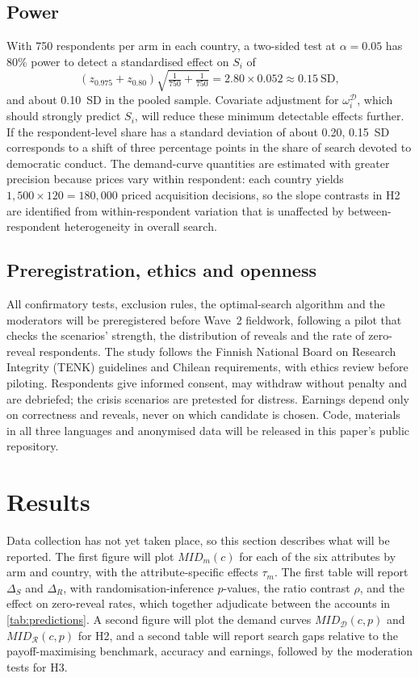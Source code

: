 \documentclass[11pt]{article}
\newcommand{\MID}{\mathit{MID}}
\newcommand{\Dem}{\mathcal{D}}
\newcommand{\Res}{\mathcal{R}}
\begin{document}
\subsection{Power}

With 750 respondents per arm in each country, a two-sided test at $\alpha=0.05$ has 80\% power to detect a standardised effect on $S_i$ of
\[
(z_{0.975}+z_{0.80})\sqrt{\tfrac{1}{750}+\tfrac{1}{750}}=2.80\times0.052\approx0.15\ \text{SD},
\]
and about 0.10~SD in the pooled sample. Covariate adjustment for $\omega_i^{\Dem}$, which should strongly predict $S_i$, will reduce these minimum detectable effects further. If the respondent-level share has a standard deviation of about 0.20, 0.15~SD corresponds to a shift of three percentage points in the share of search devoted to democratic conduct. The demand-curve quantities are estimated with greater precision because prices vary within respondent: each country yields $1{,}500\times120=180{,}000$ priced acquisition decisions, so the slope contrasts in H2 are identified from within-respondent variation that is unaffected by between-respondent heterogeneity in overall search.

\subsection{Preregistration, ethics and openness}

All confirmatory tests, exclusion rules, the optimal-search algorithm and the moderators will be preregistered before Wave~2 fieldwork, following a pilot that checks the scenarios' strength, the distribution of reveals and the rate of zero-reveal respondents. The study follows the Finnish National Board on Research Integrity (TENK) guidelines and Chilean requirements, with ethics review before piloting. Respondents give informed consent, may withdraw without penalty and are debriefed; the crisis scenarios are pretested for distress. Earnings depend only on correctness and reveals, never on which candidate is chosen. Code, materials in all three languages and anonymised data will be released in this paper's public repository.

\section{Results}

Data collection has not yet taken place, so this section describes what will be reported. The first figure will plot $\MID_m(c)$ for each of the six attributes by arm and country, with the attribute-specific effects $\tau_m$. The first table will report $\Delta_S$ and $\Delta_R$, with randomisation-inference $p$-values, the ratio contrast $\rho$, and the effect on zero-reveal rates, which together adjudicate between the accounts in \cref{tab:predictions}. A second figure will plot the demand curves $\MID_{\Dem}(c,p)$ and $\MID_{\Res}(c,p)$ for H2, and a second table will report search gaps relative to the payoff-maximising benchmark, accuracy and earnings, followed by the moderation tests for H3.

\clearpage
\singlespacing
\printbibliography
\end{document}
